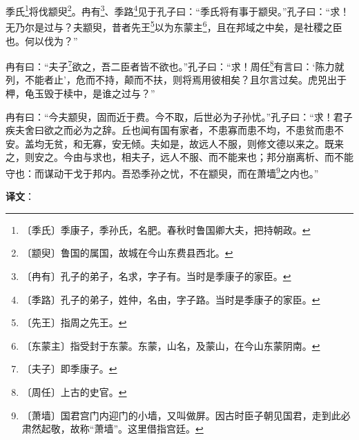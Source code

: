 \documentclass[12pt,UTF-8,openany,a4]{ctexbook}
\begin{document}
\begin{large}
    
    季氏\footnote{〔季氏〕\yiwen 季康子，季孙氏，名肥。春秋时鲁国卿大夫，把持朝政。}将伐颛臾\footnote{〔颛臾〕\yiwen 鲁国的属国，故城在今山东费县西北。}。冉有\footnote{〔冉有〕\yiwen 孔子的弟子，名求，字子有。当时是季康子的家臣。}、季路\footnote{〔季路〕\yiwen 孔子的弟子，姓仲，名由，字子路。当时是季康子的家臣。}见于孔子曰：“季氏将有事于颛臾。”孔子曰：“求！无乃尔是过与？夫颛臾，昔者先王\footnote{〔先王〕\yiwen 指周之先王。}以为东蒙主\footnote{〔东蒙主〕\yiwen 指受封于东蒙。东蒙，山名，及蒙山，在今山东蒙阴南。}，且在邦域之中矣，是社稷之臣也。何以伐为？”
    
    冉有曰：“夫子\footnote{〔夫子〕\yiwen 即季康子。}欲之，吾二臣者皆不欲也。”孔子曰：“求！周任\footnote{〔周任〕\yiwen 上古的史官。}有言曰：‘陈力就列，不能者止’，危而不持，颠而不扶，则将焉用彼相矣？且尔言过矣。虎兕出于柙，龟玉毁于椟中，是谁之过与？”
    
    冉有曰：“今夫颛臾，固而近于费。今不取，后世必为子孙忧。”孔子曰：“求！君子疾夫舍曰欲之而必为之辞。丘也闻有国有家者，不患寡而患不均，不患贫而患不安。盖均无贫，和无寡，安无倾。夫如是，故远人不服，则修文德以来之。既来之，则安之。今由与求也，相夫子，远人不服、而不能来也；邦分崩离析、而不能守也：而谋动干戈于邦内。吾恐季孙之忧，不在颛臾，而在萧墙\footnote{〔萧墙〕\yiwen 国君宫门内迎门的小墙，又叫做屏。因古时臣子朝见国君，走到此必肃然起敬，故称“萧墙”。这里借指宫廷。}之内也。”

\end{large}


\newpage

\begin{Large}
   \noindent \textbf{译文}：
\end{Large}

\vspace{1em}
\end{document}
